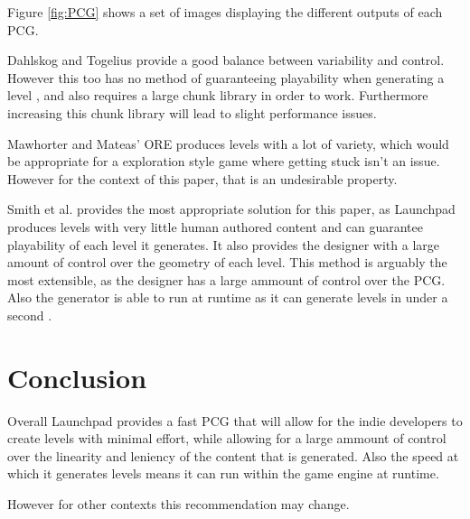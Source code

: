 \documentclass{scrartcl}
\begin{document}
Figure \ref{fig:PCG} shows a set of images displaying the different outputs of each PCG.

Dahlskog and Togelius provide a good balance between variability and control. However this too has no method of guaranteeing playability when generating a level \cite[p.4]{dahlskog2014}, and also requires a large chunk library in order to work. Furthermore increasing this chunk library will lead to slight performance issues.

Mawhorter and Mateas' ORE produces levels with a lot of variety, which would be appropriate for a exploration style game where getting stuck isn't an issue. However for the context of this paper, that is an undesirable property.

Smith et al. provides the most appropriate solution for this paper, as Launchpad produces levels with very little human authored content and can guarantee playability of each level it generates. It also provides the designer with a large amount of control over the geometry of each level. This method is arguably the most extensible, as the designer has a large ammount of control over the PCG. Also the generator is able to run at runtime as it can generate levels in under a second \cite[p.8]{smith2012web}.



\section{Conclusion}

Overall Launchpad provides a fast PCG that will allow for the indie developers to create levels with minimal effort, while allowing for a large ammount of control over the linearity and leniency of the content that is generated. Also the speed at which it generates levels means it can run within the game engine at runtime.


However for other contexts this recommendation may change.






\end{document}
